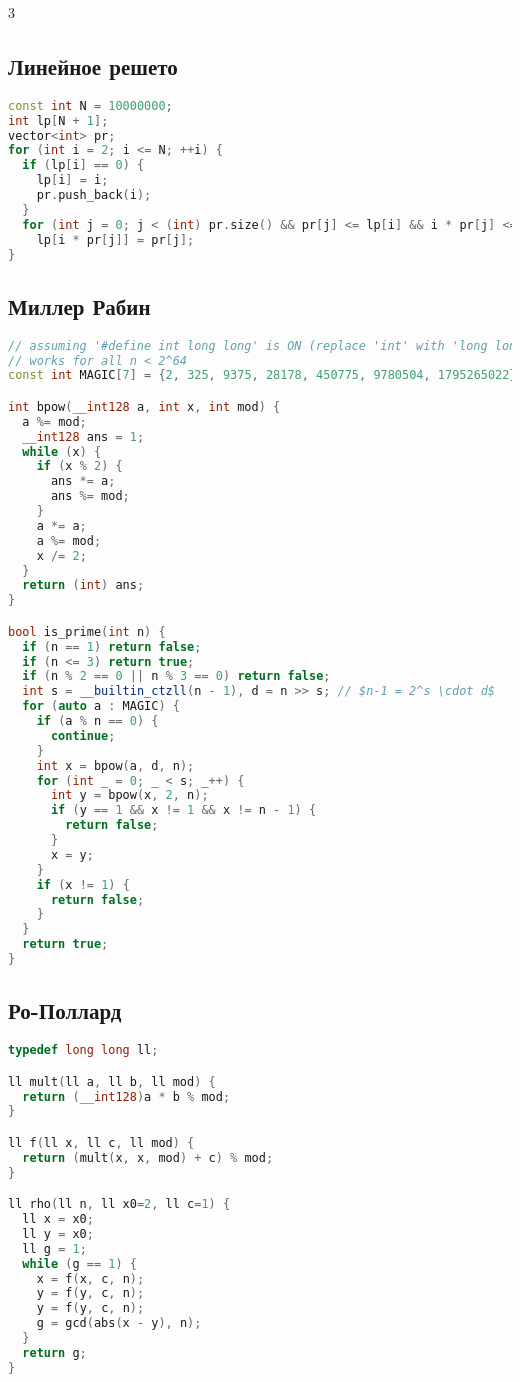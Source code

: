 \documentclass[10pt,a4paper,landscape,twosided]{extarticle}
\begin{document}
\begin{multicols*}{3}
\subsection{Линейное решето}
\begin{lstlisting}[language=C++]
const int N = 10000000;
int lp[N + 1];
vector<int> pr;
for (int i = 2; i <= N; ++i) {
  if (lp[i] == 0) {
    lp[i] = i;
    pr.push_back(i);
  }
  for (int j = 0; j < (int) pr.size() && pr[j] <= lp[i] && i * pr[j] <= N; ++j)
    lp[i * pr[j]] = pr[j];
}
\end{lstlisting}

\subsection{Миллер Рабин}
\begin{lstlisting}[language=C++]
// assuming '#define int long long' is ON (replace 'int' with 'long long' if not)
// works for all n < 2^64
const int MAGIC[7] = {2, 325, 9375, 28178, 450775, 9780504, 1795265022};

int bpow(__int128 a, int x, int mod) {
  a %= mod;
  __int128 ans = 1;
  while (x) {
    if (x % 2) {
      ans *= a;
      ans %= mod;
    }
    a *= a;
    a %= mod;
    x /= 2;
  }
  return (int) ans;
}

bool is_prime(int n) {
  if (n == 1) return false;
  if (n <= 3) return true;
  if (n % 2 == 0 || n % 3 == 0) return false;
  int s = __builtin_ctzll(n - 1), d = n >> s; // $n-1 = 2^s \cdot d$
  for (auto a : MAGIC) {
    if (a % n == 0) {
      continue;
    }
    int x = bpow(a, d, n);
    for (int _ = 0; _ < s; _++) {
      int y = bpow(x, 2, n);
      if (y == 1 && x != 1 && x != n - 1) {
        return false;
      }
      x = y;
    }
    if (x != 1) {
      return false;
    }
  }
  return true;
}
\end{lstlisting}

\subsection{Ро-Поллард}
\begin{lstlisting}[language=C++]
typedef long long ll;

ll mult(ll a, ll b, ll mod) {
  return (__int128)a * b % mod;
}

ll f(ll x, ll c, ll mod) {
  return (mult(x, x, mod) + c) % mod;
}

ll rho(ll n, ll x0=2, ll c=1) {
  ll x = x0;
  ll y = x0;
  ll g = 1;
  while (g == 1) {
    x = f(x, c, n);
    y = f(y, c, n);
    y = f(y, c, n);
    g = gcd(abs(x - y), n);
  }
  return g;
}


\end{lstlisting}
\end{multicols*}
\end{document}
